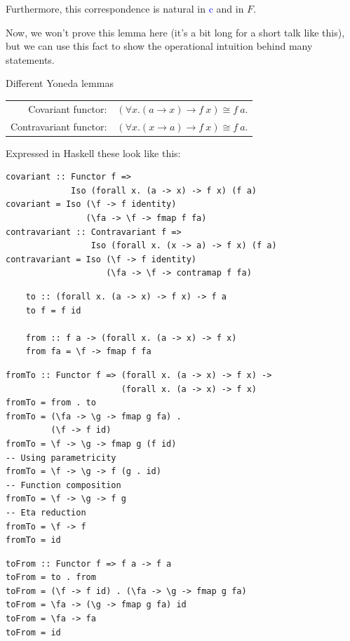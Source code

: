 \documentclass[tikz]{beamer}
\newcommand{\blue}[1]{\textcolor{blue}{#1}}
\theoremstyle{definition}
\begin{document}
\frame
{
	Furthermore, this correspondence is natural in \blue{c} and in $F$.
}


\frame
{
	Now, we won't prove this lemma here (it's a bit long for a short talk like this), but we can use this fact to show the operational intuition behind many statements. 
}

\begin{frame}
\begin{block}{Different Yoneda lemmas}
\begin{tabular}{rc}
Covariant functor:     & $(\forall x. (a \to x) \to f~x) \cong f~a$. \\
Contravariant functor: & $(\forall x. (x \to a) \to f~x) \cong f~a$.
\end{tabular}
\end{block}
\end{frame}

\begin{frame}[fragile]
Expressed in Haskell these look like this:
\begin{verbatim}
covariant :: Functor f =>
             Iso (forall x. (a -> x) -> f x) (f a)
covariant = Iso (\f -> f identity)
                (\fa -> \f -> fmap f fa)
contravariant :: Contravariant f =>
                 Iso (forall x. (x -> a) -> f x) (f a)
contravariant = Iso (\f -> f identity)
                    (\fa -> \f -> contramap f fa)
\end{verbatim}
\end{frame}

\begin{frame}[fragile]
	\begin{verbatim}
	to :: (forall x. (a -> x) -> f x) -> f a
	to f = f id
	
	from :: f a -> (forall x. (a -> x) -> f x)
	from fa = \f -> fmap f fa
	\end{verbatim}
\end{frame}

\begin{frame}[fragile]
\begin{verbatim}
fromTo :: Functor f => (forall x. (a -> x) -> f x) ->
                       (forall x. (a -> x) -> f x)
fromTo = from . to
fromTo = (\fa -> \g -> fmap g fa) .
         (\f -> f id)
fromTo = \f -> \g -> fmap g (f id)
-- Using parametricity
fromTo = \f -> \g -> f (g . id)
-- Function composition
fromTo = \f -> \g -> f g
-- Eta reduction
fromTo = \f -> f
fromTo = id
\end{verbatim}
\end{frame}
\begin{frame}[fragile]
\begin{verbatim}
toFrom :: Functor f => f a -> f a
toFrom = to . from
toFrom = (\f -> f id) . (\fa -> \g -> fmap g fa)
toFrom = \fa -> (\g -> fmap g fa) id
toFrom = \fa -> fa
toFrom = id
\end{verbatim}
\end{frame}
\end{document}
